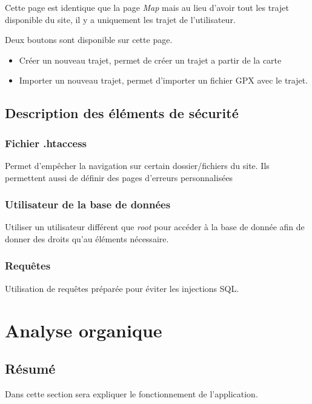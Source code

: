 \documentclass[a4paper]{article}
\begin{document}
Cette page est identique que la page \emph{Map} mais au lieu d'avoir tout les trajet disponible du site, il y a uniquement les trajet de l'utilisateur.

Deux boutons sont disponible sur cette page.
\begin{itemize}
    \item Créer un nouveau trajet, permet de créer un trajet a partir de la carte
    \item Importer un nouveau trajet, permet d'importer un fichier GPX avec le trajet.
\end{itemize}

\subsection{Description des éléments de sécurité}
\subsubsection{Fichier .htaccess}
Permet d'empêcher la navigation sur certain dossier/fichiers du site. Ils permettent aussi de définir des pages d'erreurs personnalisées

\subsubsection{Utilisateur de la base de données}
Utiliser un utilisateur différent que \emph{root} pour accéder à la base de donnée afin de donner des droits qu'au éléments nécessaire.

\subsubsection{Requêtes}
Utilisation de requêtes préparée pour éviter les injections SQL.


\pagebreak








\pagebreak


\section{Analyse organique} 
\subsection{Résumé}
Dans cette section sera expliquer le fonctionnement de l'application.
\end{document}
